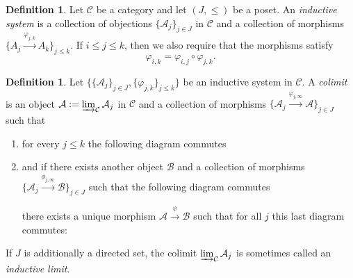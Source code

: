 \documentclass[12pt]{article}
\theoremstyle{definition}
\newtheorem{definition}[theorem]{Definition}
\newcommand{\mc}[1]{\mathcal{#1}}
\newcommand{\<}{\langle}
\renewcommand{\>}{\rangle}
\begin{document}
\begin{definition}
    Let $\mc C$ be a category and let $(J, \leq)$ be a poset. An \textit{inductive system} is a collection of objections $\{\mc A_j\}_{j \in J}$ in $\mc C$ and a collection of morphisms $\{A_j \overset{\varphi_{j,k}}{\to} A_k\}_{j \leq k}$. If $i \leq j \leq k$, then we also require that the morphisms satisfy
    \[
    \varphi_{i,k} = \varphi_{i,j} \circ \varphi_{j,k}.
    \]
\end{definition}

\begin{definition} \label{defn: colimit}
    Let $\{\{\mc A_j\}_{j \in J}, \{\varphi_{j,k}\}_{j \leq k}\}$ be an inductive system in $\mc C$. A \textit{colimit} is an object $\mc A:= \varinjlim_{\mc C} \mc A_j$ in $\mc C$ and a collection of morphisms $\{\mc A_j \overset{\varphi_{j,\infty}}{\to} \mc A\}_{j \in J}$ such that
    \begin{enumerate}
        \item for every $j \leq k$ the following diagram commutes
    \begin{center}
    \end{center}
    \item and if there exists another object $\mc B$ and a collection of morphisms $\{\mc A_j \overset{\phi_{j,\infty}}{\to} \mc B\}_{j \in J}$ such that the following diagram commutes
    \begin{center}
    \end{center}
    there exists a unique morphism $\mc A \overset{\psi}{\to} \mc B$ such that for all $j$ this last diagram commutes:
    \begin{center}
    \end{center}
    \end{enumerate}
    If $J$ is additionally a directed set, the colimit $\varinjlim_{\mc C} \mc A_j$ is sometimes called an \textit{inductive limit}.
\end{definition}
\end{document}
